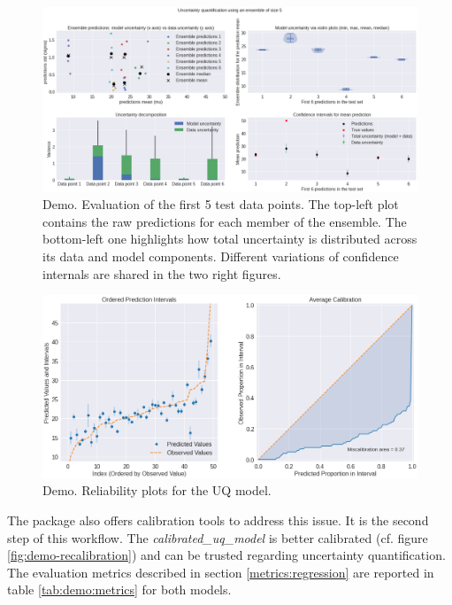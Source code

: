 \begin{figure}[!ht]
    \centering
    \includegraphics[width=\linewidth]{figures/eval/demo/demo_eval.png}
    \caption{Demo. Evaluation of the first 5 test data points. The top-left plot contains the raw predictions for each member of the ensemble. The bottom-left one highlights how total uncertainty is distributed across its data and model components. Different variations of confidence internals are shared in the two right figures.}
    \label{fig:demo-viz}
\end{figure}

\begin{figure}[!ht]
    \centering
    \includegraphics[scale=0.40]{figures/eval/demo/4_evaluation.png}
    \caption{Demo. Reliability plots for the UQ model.}
    \label{fig:demo-calibration}
\end{figure}

The package also offers calibration tools to address this issue. It is the second step of this workflow. The \textit{calibrated\_uq\_model} is better calibrated (cf. figure \ref{fig:demo-recalibration}) and can be trusted regarding uncertainty quantification. The evaluation metrics described in section \ref{metrics:regression} are reported in table \ref{tab:demo:metrics} for both models. 

